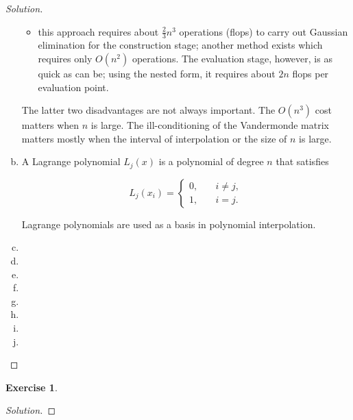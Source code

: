 \documentclass[12pt,a4]{article}
\theoremstyle{definition}
\newtheorem{exercise}{Exercise}
\begin{document}
\begin{proof}[Solution]
\begin{enumerate}[(a)]
\begin{itemize}
			\item this approach requires about $\frac{2}{3} n^3$ operations (flops) to carry out Gaussian elimination for the construction stage; another method exists which requires only $O(n^2)$ operations. The evaluation stage, however, is as quick as can be; using the nested form, it requires about $2 n$ flops per evaluation point. 
		\end{itemize} 
		
		The latter two disadvantages are not always important. The $O(n^3)$ cost matters when $n$ is large. The ill-conditioning of the Vandermonde matrix matters mostly when the interval of interpolation or the size of $n$ is large. 
		
		\item A Lagrange polynomial $L_j(x)$ is a polynomial of degree $n$ that satisfies
		
		\[
		L_j(x_i) = \begin{cases}
		0 {,} &\quad i \neq j {,} \\
		1 {,} &\quad i = j {.}
		\end{cases}
		\]
		
		Lagrange polynomials are used as a basis in polynomial interpolation. 
		
		\item 
		
		\item 
		
		\item 
		
		\item 
		
		\item 
		
		\item 
		
		\item 
		
		\item 
	\end{enumerate}
\end{proof}

\begin{exercise}
	 
\end{exercise}
\begin{proof}[Solution]
	
\end{proof}
\end{document}
